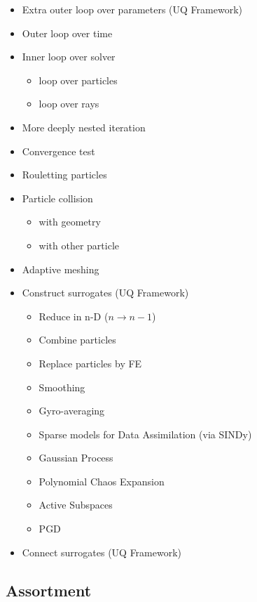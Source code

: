 \begin{itemize}
\item
  Extra outer loop over parameters (UQ Framework)
\item
  Outer loop over time
\item
  Inner loop over solver

  \begin{itemize}
  \item
    loop over particles
  \item
    loop over rays
  \end{itemize}
\item
  More deeply nested iteration
\item
  Convergence test
\item
  Rouletting particles
\item
  Particle collision

  \begin{itemize}
  \item
    with geometry
  \item
    with other particle
  \end{itemize}
\item
  Adaptive meshing
\item
  Construct surrogates (UQ Framework)

  \begin{itemize}
  \item
    Reduce in n-D (\(n \rightarrow n-1\))
  \item
    Combine particles
  \item
    Replace particles by FE
  \item
    Smoothing
  \item
    Gyro-averaging
  \item
    Sparse models for Data Assimilation (via SINDy)
  \item
    Gaussian Process
  \item
    Polynomial Chaos Expansion
  \item
    Active Subspaces
  \item
    PGD
  \end{itemize}
\item
  Connect surrogates (UQ Framework)
\end{itemize}

\subsection{Assortment}\label{sec:assortment}

